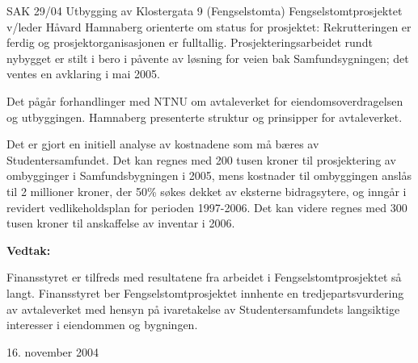 \begin{instruksledd}{SAK 29/04 Utbygging av Klostergata 9 (Fengselstomta)}
    Fengselstomtprosjektet v/leder Håvard Hamnaberg orienterte om status for prosjektet:
    Rekrutteringen er ferdig og
    prosjektorganisasjonen er fulltallig. Prosjekteringsarbeidet rundt nybygget er stilt i
    bero i påvente av løsning for veien
    bak Samfundsygningen; det ventes en avklaring i mai 2005.

    Det pågår forhandlinger med NTNU om avtaleverket for eiendomsoverdragelsen og
    utbyggingen. Hamnaberg
    presenterte struktur og prinsipper for avtaleverket.
    
    Det er gjort en initiell analyse av kostnadene som må bæres av Studentersamfundet. Det
    kan regnes med 200 tusen
    kroner til prosjektering av ombygginger i Samfundsbygningen i 2005, mens kostnader til
    ombyggingen anslås til 2
    millioner kroner, der 50\% søkes dekket av eksterne bidragsytere, og inngår i revidert
    vedlikeholdsplan for perioden
    1997-2006. Det kan videre regnes med 300 tusen kroner til anskaffelse av inventar i
    2006.

    \textbf{Vedtak:}

    Finansstyret er tilfreds med resultatene fra arbeidet i Fengselstomtprosjektet så
    langt. Finansstyret ber
    Fengselstomtprosjektet innhente en tredjepartsvurdering av avtaleverket med hensyn på
    ivaretakelse av
    Studentersamfundets langsiktige interesser i eiendommen og bygningen.
    
    16. november 2004


\end{instruksledd}


